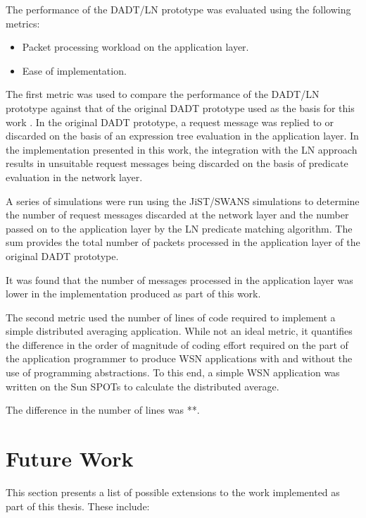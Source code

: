 The performance of the DADT/LN prototype was evaluated using the following
metrics: 
\begin{itemize}
  \item Packet processing workload on the application layer.
  \item Ease of implementation. 
\end{itemize}

The first metric was used to compare the performance of the DADT/LN prototype
against that of the original DADT prototype used as the basis for this work
\cite{migliavacca_DADT:2006}. In the original DADT prototype, a request message
was replied to or discarded on the basis of an expression tree evaluation in the
application layer. In the implementation presented in this work, the integration
with the LN approach results in unsuitable request messages being discarded on
the basis of predicate evaluation in the network layer. 


A series of simulations were run using the JiST/SWANS simulations to determine
the number of request messages discarded at the network layer and the number
passed on to the application layer by the LN predicate matching algorithm. The
sum provides the total number of packets processed in the application layer of
the original DADT prototype.

It was found that the number of messages processed in the application layer was
lower in the implementation produced as part of this work.


The second metric used the number of lines of code required to implement a
simple distributed averaging application. While not an ideal metric, it
quantifies the difference in the order of magnitude of coding effort required on
the part of the application programmer to produce WSN applications with and
without the use of programming abstractions. To this end, a simple WSN
application was written on the Sun SPOTs to calculate the distributed average.

The difference in the number of lines was **.

\section{Future Work}

This section presents a list of possible extensions to the work implemented as
part of this thesis. These include:

